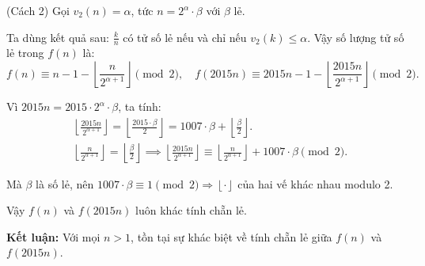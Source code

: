 \documentclass[../06-largest-exponent.tex]{subfiles}
\begin{document}

\begin{soln}(Cách 2)\footnotemark
    Gọi \( v_2(n) = \alpha \), tức \( n = 2^\alpha \cdot \beta \) với \( \beta \) lẻ.

    Ta dùng kết quả sau: \( \frac{k}{n} \) có tử số lẻ nếu và chỉ nếu \( v_2(k) \le \alpha \).  
    Vậy số lượng tử số lẻ trong \( f(n) \) là:
    \[
        f(n) \equiv n - 1 - \left\lfloor \frac{n}{2^{\alpha + 1}} \right\rfloor \pmod{2},\quad
        f(2015n) \equiv 2015n - 1 - \left\lfloor \frac{2015n}{2^{\alpha + 1}} \right\rfloor \pmod{2}.
    \]

    Vì \( 2015n = 2015 \cdot 2^\alpha \cdot \beta \), ta tính:
    \[
        \begin{aligned}
            &\left\lfloor \frac{2015n}{2^{\alpha + 1}} \right\rfloor = \left\lfloor \frac{2015 \cdot \beta}{2} \right\rfloor = 1007 \cdot \beta + \left\lfloor \frac{\beta}{2} \right\rfloor.\\
            &\left\lfloor \frac{n}{2^{\alpha + 1}} \right\rfloor = \left\lfloor \frac{\beta}{2} \right\rfloor \implies
            \left\lfloor \frac{2015n}{2^{\alpha + 1}} \right\rfloor \equiv \left\lfloor \frac{n}{2^{\alpha + 1}} \right\rfloor + 1007 \cdot \beta \pmod{2}.
        \end{aligned}
    \]

    Mà \( \beta \) là số lẻ, nên \( 1007 \cdot \beta \equiv 1 \pmod{2} \Rightarrow \left\lfloor \cdot \right\rfloor \) của hai vế khác nhau modulo 2.

    Vậy \( f(n) \) và \( f(2015n) \) luôn khác tính chẵn lẻ.

    \textbf{Kết luận:} Với mọi \( n > 1 \), tồn tại sự khác biệt về tính chẵn lẻ giữa \( f(n) \) và \( f(2015n) \).
\end{soln}

\end{document}
